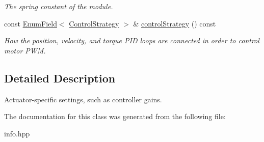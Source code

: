 \begin{DoxyCompactItemize}
\begin{DoxyCompactList}\small\item\em The spring constant of the module. \end{DoxyCompactList}\item 
const \hyperlink{classhebi_1_1Info_1_1EnumField}{Enum\+Field}$<$ \hyperlink{classhebi_1_1Info_a154026587295ad17a3e1460f32dab668}{Control\+Strategy} $>$ \& \hyperlink{classhebi_1_1Info_1_1Settings_1_1Actuator_aaa17c720329614ca2c15083645ed9037}{control\+Strategy} () const \hypertarget{classhebi_1_1Info_1_1Settings_1_1Actuator_aaa17c720329614ca2c15083645ed9037}{}\label{classhebi_1_1Info_1_1Settings_1_1Actuator_aaa17c720329614ca2c15083645ed9037}

\begin{DoxyCompactList}\small\item\em How the position, velocity, and torque P\+ID loops are connected in order to control motor P\+WM. \end{DoxyCompactList}\end{DoxyCompactItemize}


\subsection{Detailed Description}
Actuator-\/specific settings, such as controller gains. 

The documentation for this class was generated from the following file\+:\begin{DoxyCompactItemize}
\item 
info.\+hpp\end{DoxyCompactItemize}
